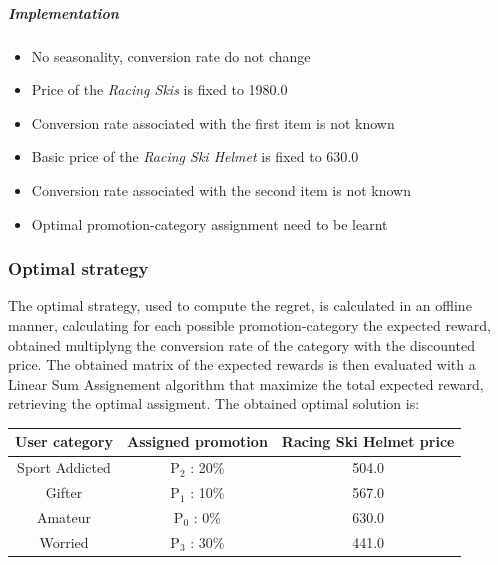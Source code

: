\subparagraph{Implementation} 
\begin{itemize}
	\item No seasonality, conversion rate do not change
	\item Price of the \textit{Racing Skis} is fixed to 1980.0
	\item Conversion rate associated with the first item is not known
	\item Basic price of the \textit{Racing Ski Helmet} is fixed to 630.0
	\item Conversion rate associated with the second item is not known
	\item Optimal promotion-category assignment need to be learnt
\end{itemize}

\subsubsection{Optimal strategy}The optimal strategy, used to compute the regret, is calculated in an offline manner, calculating for each possible promotion-category the expected reward, obtained multiplyng the conversion rate of the category with the discounted price. The obtained matrix of the expected rewards is then evaluated with a Linear Sum Assignement algorithm that maximize the total expected reward, retrieving the optimal assigment. The obtained optimal solution is:\\
\begin{center}
	\begin{tabular}{ |c|c|c|} 
	\hline
	User category & Assigned promotion & Racing Ski Helmet price \\
	\hline
	Sport Addicted & P$_2$ : 20\% & 504.0 \\
	\hline
	Gifter & P$_1$ : 10\% & 567.0 \\
	\hline
	Amateur & P$_0$ : 0\% & 630.0 \\
	\hline
	Worried & P$_3$ : 30\% & 441.0 \\
	\hline
	\end{tabular}
\end{center}

